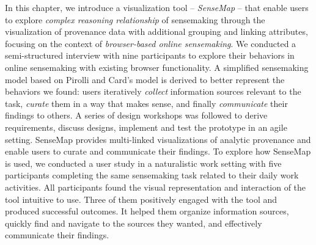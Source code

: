 In this chapter, we introduce a visualization tool -- \emph{SenseMap} -- that enable users to explore \emph{complex reasoning relationship} of sensemaking through the visualization of provenance data with additional grouping and linking attributes, focusing on the context of \emph{browser-based online sensemaking}. We conducted a semi-structured interview with nine participants to explore their behaviors in online sensemaking with existing browser functionality. A simplified sensemaking model based on Pirolli and Card's model is derived to better represent the behaviors we found: users iteratively \emph{collect} information sources relevant to the task, \emph{curate} them in a way that makes sense, and finally \emph{communicate} their findings to others. A series of design workshops was followed to derive requirements, discuss designs, implement and test the prototype in an agile setting. SenseMap provides multi-linked visualizations of analytic provenance and enable users to curate and communicate their findings. To explore how SenseMap is used, we conducted a user study in a naturalistic work setting with five participants completing the same sensemaking task related to their daily work activities. All participants found the visual representation and interaction of the tool intuitive to use. Three of them positively engaged with the tool and produced successful outcomes. It helped them organize information sources, quickly find and navigate to the sources they wanted, and effectively communicate their findings.





